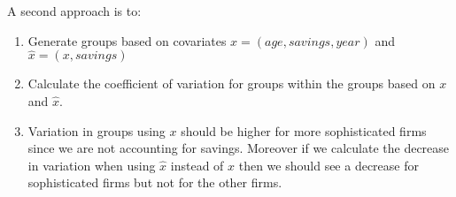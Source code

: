 \documentclass[12pt]{article}
\begin{document}
A second approach is to: 
\begin{enumerate}
    \item Generate groups based on covariates $x = (age, savings, year)$ and $\hat{x}= (x, savings)$ 
    \item Calculate the coefficient of variation for groups within the groups based on $x$ and $\hat{x}$. 
    \item Variation in groups using $x$ should be higher for more sophisticated firms since we are not accounting for savings. Moreover if we calculate the decrease in variation when using $\hat{x}$  instead of $x$ then we should see a decrease for sophisticated firms but not for the other firms. 
\end{enumerate}


\end{document}
